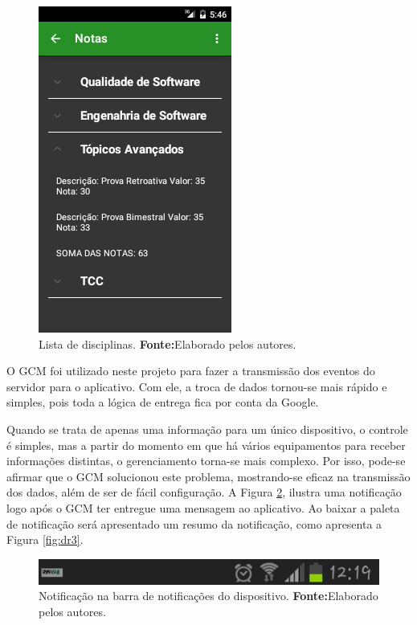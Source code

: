 \begin{figure}[h!]
    \centerline{\includegraphics[scale=0.8]{./imagens/3_discussao_resultados/dr1.png}}
    \caption[Lista de disciplinas]{Lista de disciplinas.
        \textbf{Fonte:}Elaborado pelos autores.}
    \label{fig:dr1}
\end{figure}

    \pagebreak

    \par O GCM foi utilizado neste projeto para fazer a transmissão dos eventos do
servidor para o aplicativo. Com ele, a troca de dados tornou-se mais rápido e
simples, pois toda a lógica de entrega fica por conta da Google.

    \par Quando se trata de apenas uma informação para um único dispositivo, o
controle é simples, mas a partir do momento em que há vários equipamentos para
receber informações distintas, o gerenciamento torna-se mais complexo. Por
isso, pode-se afirmar que o GCM solucionou este problema, mostrando-se eficaz
na transmissão dos dados, além de ser de fácil configuração. A Figura
\ref{fig:dr2}, ilustra uma notificação logo após o GCM ter entregue uma
mensagem ao aplicativo. Ao baixar a paleta de notificação será apresentado um
resumo da notificação, como apresenta a Figura \ref{fig:dr3}.


\begin{figure}[h!]
    \centerline{\includegraphics[scale=0.8]{./imagens/3_discussao_resultados/dr2.png}}
    \caption[Notificação na barra de notificações do dispositivo.]{Notificação na
    barra de notificações do dispositivo.
    \textbf{Fonte:}Elaborado pelos autores.}
    \label{fig:dr2}
\end{figure}


